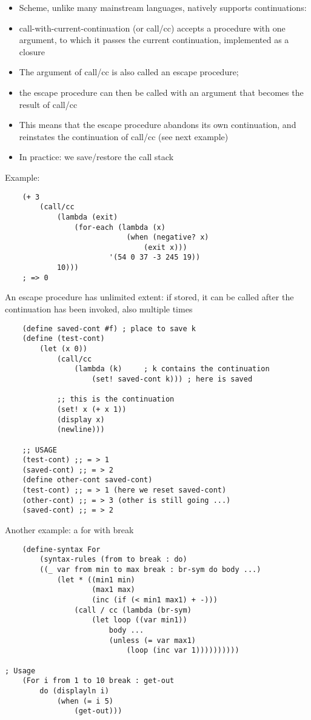 \begin{itemize}
    \item Scheme, unlike many mainstream languages, natively supports continuations:
    \item call-with-current-continuation (or call/cc) accepts a procedure with one argument, to which it passes the current continuation, implemented as a closure
    \item The argument of call/cc is also called an escape procedure;
    \item the escape procedure can then be called with an argument that becomes the result of call/cc
    \item This means that the escape procedure abandons its own continuation, and reinstates the continuation of call/cc (see next example)
    \item In practice: we save/restore the call stack
\end{itemize}
Example:
\begin{lstlisting}
    (+ 3
        (call/cc
            (lambda (exit)
                (for-each (lambda (x)
                            (when (negative? x)
                                (exit x)))
                        '(54 0 37 -3 245 19))
            10)))
    ; => 0
\end{lstlisting}
An escape procedure has unlimited extent: if stored, it can be called after the continuation has been invoked, also multiple times
\begin{lstlisting}
    (define saved-cont #f) ; place to save k
    (define (test-cont)
        (let (x 0))
            (call/cc
                (lambda (k)     ; k contains the continuation
                    (set! saved-cont k))) ; here is saved

            ;; this is the continuation        
            (set! x (+ x 1))
            (display x)
            (newline)))

    ;; USAGE
    (test-cont) ;; = > 1
    (saved-cont) ;; = > 2
    (define other-cont saved-cont)
    (test-cont) ;; = > 1 (here we reset saved-cont)
    (other-cont) ;; = > 3 (other is still going ...)
    (saved-cont) ;; = > 2

\end{lstlisting}
Another example: a for with break
\begin{lstlisting}
    (define-syntax For
        (syntax-rules (from to break : do)
        ((_ var from min to max break : br-sym do body ...)
            (let * ((min1 min)
                    (max1 max)
                    (inc (if (< min1 max1) + -)))
                (call / cc (lambda (br-sym)
                    (let loop ((var min1))
                        body ...
                        (unless (= var max1)
                            (loop (inc var 1))))))))))

; Usage
    (For i from 1 to 10 break : get-out
        do (displayln i)
            (when (= i 5)
                (get-out)))

\end{lstlisting}

